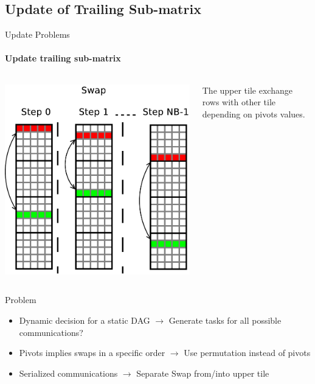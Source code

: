 \subsection{Update of Trailing Sub-matrix}

\begin{frame}{Update Problems}
\framesubtitle{Update trailing sub-matrix}
\begin{columns}
\begin{column}{.50\textwidth}
\begin{center}
\includegraphics[scale=0.2]{update_swap.pdf}
\end{center}
\end{column}
\hfill
\begin{column}{.50\textwidth}
The upper tile exchange rows with other tile depending on pivots values.
\end{column}
\end{columns}
\pause
\begin{footnotesize}
\begin{exampleblock}{Problem}
\begin{itemize}
\item Dynamic decision for a static DAG
\pause
$\rightarrow$ Generate tasks for all possible communications?
\pause
\item Pivots implies swaps in a specific order
\pause
$\rightarrow$ Use permutation instead of pivots
\pause
\item Serialized communications
\pause
$\rightarrow$ Separate Swap from/into upper tile
\end{itemize}
\end{exampleblock}{}
\end{footnotesize}
\end{frame}


